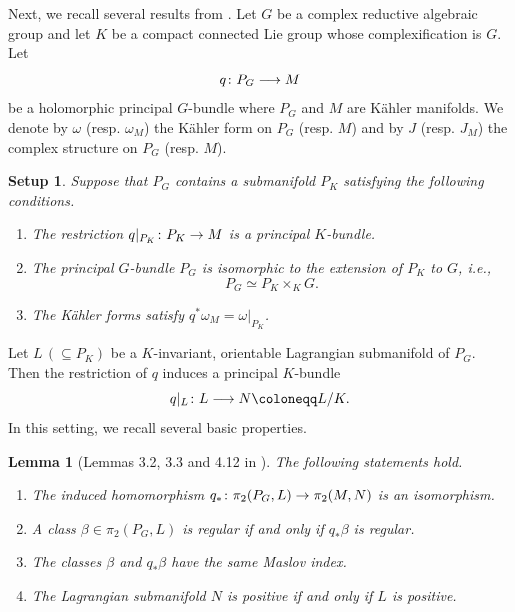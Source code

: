 \documentclass[11pt]{amsart}
\theoremstyle{plain}
\newtheorem{lemma}[theorem]{Lemma}
\newtheorem{setup}[theorem]{Setup}
\theoremstyle{definition}
\theoremstyle{remark}
\numberwithin{equation}{section} \numberwithin{table}{section}
\def\to{\mathchoice{\longrightarrow}{\rightarrow}{\rightarrow}{\rightarrow}}
\numberwithin{equation}{section}
\begin{document}
Next, we recall several results from \cite{Kim26}. Let $G$ be a complex reductive algebraic group and let $K$ be a compact connected Lie group whose complexification is $G$. Let 
\begin{equation}\label{equ_qbundleprojection}
q \colon P_G \to M
\end{equation}
be a holomorphic principal $G$-bundle where $P_G$ and $M$ are K\"{a}hler manifolds. 
We denote by $\omega$ (resp. $\omega_M$) the K\"{a}hler form on $P_{G}$ (resp. $M$) and by $J$ (resp. $J_M$) the complex structure on $P_{G}$ (resp. $M$). 

\begin{setup}\label{assumption_pgpmathbbg}
Suppose that $P_G$ contains a submanifold $P_K$ satisfying the following conditions.
\begin{enumerate}
\item The restriction $q |_{P_K} \colon P_K \to M$ is a principal $K$-bundle.
\item The principal $G$-bundle $P_G$ is isomorphic to the extension of $P_K$ to $G$, i.e., 
$$
P_G \simeq P_K \times_K G.
$$
\item The K\"{a}hler forms satisfy $q^* \omega_{M} = \omega |_{P_K}$.
\end{enumerate}
\end{setup}

Let $L \, (\subseteq P_K)$ be a $K$-invariant, orientable Lagrangian submanifold of $P_G$. Then the restriction of $q$ induces a principal $K$-bundle
\begin{equation}\label{equ_qLprincipal}
q |_{L} \colon L \to N \coloneqq L / K.
\end{equation}
In this setting, we recall several basic properties.

\begin{lemma}[Lemmas 3.2, 3.3 and 4.12 in \cite{Kim26}]\label{lemma_factsfromKIM}
The following statements hold.
\begin{enumerate}
\item The induced homomorphism $q_* \colon \pi_2 (P_G, L) \to \pi_2(M, N)$ is an isomorphism.
\item A class $\beta \in \pi_2 (P_G, L)$ is regular if and only if $q_* \beta$ is regular. 
\item The classes $\beta$ and $q_* \beta$ have the same Maslov index.
\item The Lagrangian submanifold $N$ is positive if and only if $L$ is positive.
\end{enumerate}
\end{lemma}
\end{document}
